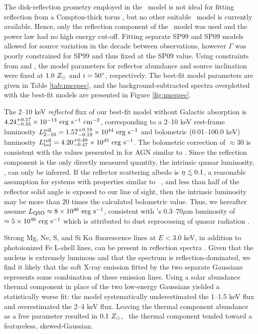 \documentclass[useAMS,usenatbib]{mn2e}
\begin{document}
The disk-reflection geometry employed in the \pexrav\ model is not
ideal for fitting reflection from a Compton-thick torus
\citep{2009MNRAS.397.1549M}, but no other suitable \xspec\ model is
currently available. Hence, only the reflection component of the
\pexrav\ model was used and the power law had no high energy
cut-off. Fitting separate SP99 and SP09 models allowed for source
variation in the decade between observations, however $\Gamma$ was
poorly constrained for SP99 and thus fixed at the SP09 value. Using
constraints from \citet{1997A&A...318L...1T} and
\citet{2000AJ....120..562T}, the model parameters for reflector
abundance and source inclination were fixed at $1.0 ~Z_{\odot}$ and $i =
50\rm{^{\circ}}$, respectively. The best-fit model parameters are given in
Table \ref{tab:nucspec}, and the background-subtracted spectra
overplotted with the best-fit models are presented in Figure
\ref{fig:nucspec}.

The 2--10 keV {\it{reflected}} flux of our best-fit model without
Galactic absorption is $4.24^{+0.57}_{-0.55} \times 10^{-13} ~\rm{\mbox{\ensuremath{\rm{erg}}}~\ensuremath{\rm{\mbox{\ensuremath{\rm{s}}}^{-1}}}~\mbox{\ensuremath{\rm{cm^{-2}}}}}$,
corresponding to a 2--10 keV rest-frame luminosity
$L^{\rm{refl}}_{2-10} = 1.57^{+0.19}_{-0.19} \times 10^{44} ~\rm{\mbox{\ensuremath{\rm{erg}}}~\ensuremath{\rm{\mbox{\ensuremath{\rm{s}}}^{-1}}}}$ and
bolometric (0.01--100.0 keV) luminosity $L_{\rm{bol}}^{\rm{refl}} =
4.20^{+0.49}_{-0.47} \times 10^{45} ~\rm{\mbox{\ensuremath{\rm{erg}}}~\ensuremath{\rm{\mbox{\ensuremath{\rm{s}}}^{-1}}}}$. The bolometric correction
of $\approx 30$ is consistent with the values presented in
\citet{2007MNRAS.381.1235V} for AGN similar to \irs. Since the
reflection component is the only directly measured quantity, the
intrinsic quasar luminosity, \lqso, can only be inferred. If the
reflector scattering albedo is $\eta \la 0.1$, a reasonable assumption
for systems with properties similar to
\irs\ \citep{2009MNRAS.397.1549M}, and less than half of the reflector
solid angle is exposed to our line of sight, then the intrinsic
luminosity may be more than 20 times the calculated bolometric
value. Thus, we hereafter assume $L_{\rm{QSO}} \approx 8 \times 10^{46}
~\rm{\mbox{\ensuremath{\rm{erg}}}~\ensuremath{\rm{\mbox{\ensuremath{\rm{s}}}^{-1}}}}$, consistent with \irs's 0.3--70$\mu$m luminosity of $\approx 5
\times 10^{46} ~\rm{\mbox{\ensuremath{\rm{erg}}}~\ensuremath{\rm{\mbox{\ensuremath{\rm{s}}}^{-1}}}}$ which is attributed to dust reprocessing of
quasar radiation \citep[][H99]{1988ApJ...328..161K}.

Strong Mg, Ne, S, and Si K$\alpha$ fluorescence lines at $E < 3.0$
keV, in addition to photoionized Fe L-shell lines, can be present in
reflection spectra \citep{1990ApJ...362...90B,
  1991MNRAS.249..352G}. Given that the nucleus is extremely luminous
and that the spectrum is reflection-dominated, we find it likely that
the soft X-ray emission fitted by the two separate Gaussians
represents some combination of these emission lines. Using a solar
abundance thermal component in place of the two low-energy Gaussians
yielded a statistically worse fit: the model systematically
underestimated the 1--1.5 keV flux and overestimated the 2--4 keV
flux. Leaving the thermal component abundance as a free parameter
resulted in $0.1 ~Z_{\odot}$, \ie\ the thermal component tended toward a
featureless, skewed-Gaussian.
\end{document}
